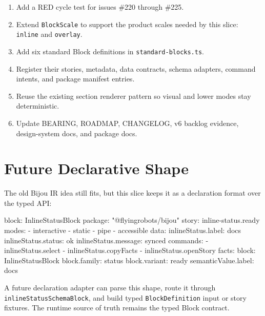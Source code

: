 \begin{enumerate}
\def\labelenumi{\arabic{enumi}.}
\tightlist
\item
  Add a RED cycle test for issues \#220 through \#225.
\item
  Extend \texttt{B\allowbreak{}l\allowbreak{}o\allowbreak{}c\allowbreak{}k\allowbreak{}S\allowbreak{}c\allowbreak{}a\allowbreak{}l\allowbreak{}e} to support the product scales needed by this slice: \texttt{i\allowbreak{}n\allowbreak{}l\allowbreak{}i\allowbreak{}n\allowbreak{}e} and \texttt{o\allowbreak{}v\allowbreak{}e\allowbreak{}r\allowbreak{}l\allowbreak{}a\allowbreak{}y}.
\item
  Add six standard Block definitions in \texttt{s\allowbreak{}t\allowbreak{}a\allowbreak{}n\allowbreak{}d\allowbreak{}a\allowbreak{}r\allowbreak{}d\allowbreak{}-\allowbreak{}b\allowbreak{}l\allowbreak{}o\allowbreak{}c\allowbreak{}k\allowbreak{}s\allowbreak{}.\allowbreak{}t\allowbreak{}s}.
\item
  Register their stories, metadata, data contracts, schema adapters, command intents, and package manifest entries.
\item
  Reuse the existing section renderer pattern so visual and lower modes stay deterministic.
\item
  Update BEARING, ROADMAP, CHANGELOG, v6 backlog evidence, design-system docs, and package docs.
\end{enumerate}

\section{Future Declarative Shape}\label{record-092-future-declarative-shape}

The old Bijou IR idea still fits, but this slice keeps it as a declaration format over the typed API:

\begin{CodeBlock}
block: InlineStatusBlock
package: "@flyingrobots/bijou"
story: inline-status.ready
modes:
  - interactive
  - static
  - pipe
  - accessible
data:
  inlineStatus.label: docs
  inlineStatus.status: ok
  inlineStatus.message: synced
commands:
  - inlineStatus.select
  - inlineStatus.copyFacts
  - inlineStatus.openStory
facts:
  block: InlineStatusBlock
  block.family: status
  block.variant: ready
  semanticValue.label: docs
\end{CodeBlock}

A future declaration adapter can parse this shape, route it through \texttt{i\allowbreak{}n\allowbreak{}l\allowbreak{}i\allowbreak{}n\allowbreak{}e\allowbreak{}S\allowbreak{}t\allowbreak{}a\allowbreak{}t\allowbreak{}u\allowbreak{}s\allowbreak{}S\allowbreak{}c\allowbreak{}h\allowbreak{}e\allowbreak{}m\allowbreak{}a\allowbreak{}B\allowbreak{}l\allowbreak{}o\allowbreak{}c\allowbreak{}k}, and build typed \texttt{B\allowbreak{}l\allowbreak{}o\allowbreak{}c\allowbreak{}k\allowbreak{}D\allowbreak{}e\allowbreak{}f\allowbreak{}i\allowbreak{}n\allowbreak{}i\allowbreak{}t\allowbreak{}i\allowbreak{}o\allowbreak{}n} input or story fixtures. The runtime source of truth remains the typed Block contract.

